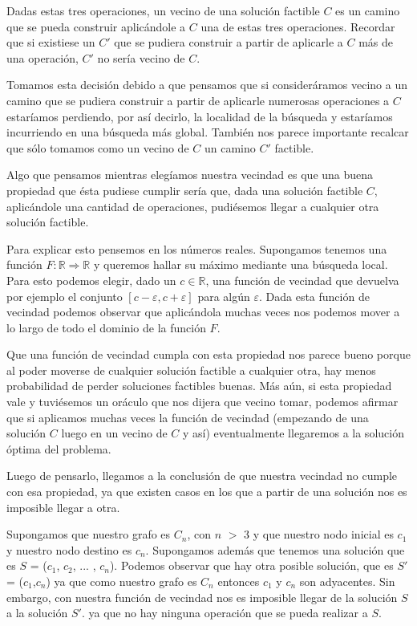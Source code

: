 Dadas estas tres operaciones, un vecino de una solución factible $C$ es un camino que se pueda construir aplicándole a $C$ una de estas tres operaciones. Recordar que si existiese un $C'$ que se pudiera construir a partir de aplicarle a $C$ más de una operación, $C'$ no sería vecino de $C$.

Tomamos esta decisión debido a que pensamos que si consideráramos vecino a un camino que se pudiera construir a partir de aplicarle numerosas operaciones a $C$ estaríamos perdiendo, por así decirlo, la localidad de la búsqueda y estaríamos incurriendo en una búsqueda más global. También nos parece importante recalcar que sólo tomamos como un vecino de $C$ un camino $C'$ factible.

Algo que pensamos mientras elegíamos nuestra vecindad es que una buena propiedad que ésta pudiese cumplir sería que, dada una solución factible $C$, aplicándole una cantidad de operaciones, pudiésemos llegar a cualquier otra solución factible.

Para explicar esto pensemos en los números reales. Supongamos tenemos una función $F: \mathbb{R} \Rightarrow \mathbb{R}$ y queremos hallar su máximo mediante una búsqueda local. Para esto podemos elegir, dado un $c \in \mathbb{R}$, una función de vecindad que devuelva por ejemplo el conjunto $[c-\varepsilon, c+\varepsilon]$  para algún $\varepsilon$. Dada esta función de vecindad podemos observar que aplicándola muchas veces nos podemos mover a lo largo de todo el dominio de la función $F$.

Que una función de vecindad cumpla con esta propiedad nos parece bueno porque al poder moverse de cualquier solución factible a cualquier otra, hay menos probabilidad de perder soluciones factibles buenas. Más aún, si esta propiedad vale y tuviésemos un oráculo que nos dijera que vecino tomar, podemos afirmar que si aplicamos muchas veces la función de vecindad (empezando de una solución $C$ luego en un vecino de $C$ y así) eventualmente llegaremos a la solución óptima del problema.

Luego de pensarlo, llegamos a la conclusión de que nuestra vecindad no cumple con esa propiedad, ya que existen casos en los que a partir de una solución nos es imposible llegar a otra.

Supongamos que nuestro grafo es $C_n$, con $n$ $>$ $3$ y que nuestro nodo inicial es $c_1$ y nuestro nodo destino es $c_n$. Supongamos además que tenemos una solución que es $S$ = ($c_1$, $c_2$, ... , $c_n$). Podemos observar que hay otra posible solución, que es $S'$ = ($c_1$,$c_n$) ya que como nuestro grafo es $C_n$ entonces $c_1$ y $c_n$ son adyacentes. Sin embargo, con nuestra función de vecindad nos es imposible llegar de la solución $S$ a la solución $S'$. ya que no hay ninguna operación que se pueda realizar a $S$.

